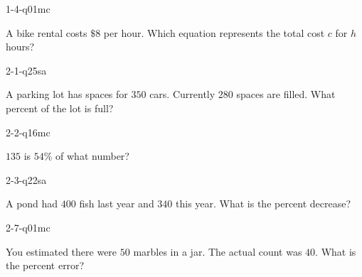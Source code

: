 
\begin{practiceQuestion}{1-4-q01}{mc}
\begin{questionText}
A bike rental costs $\$8$ per hour. Which equation represents the total cost $c$ for $h$ hours?
\end{questionText}
\end{practiceQuestion}

\begin{practiceQuestion}{2-1-q25}{sa}
\begin{questionText}
A parking lot has spaces for $350$ cars. Currently $280$ spaces are filled. What percent of the lot is full?
\end{questionText}
\end{practiceQuestion}

\begin{practiceQuestion}{2-2-q16}{mc}
\begin{questionText}
$135$ is $54\%$ of what number?
\end{questionText}
\end{practiceQuestion}

\begin{practiceQuestion}{2-3-q22}{sa}
\begin{questionText}
A pond had $400$ fish last year and $340$ this year. What is the percent decrease?


\end{questionText}
\end{practiceQuestion}

\begin{practiceQuestion}{2-7-q01}{mc}
\begin{questionText}
You estimated there were $50$ marbles in a jar. The actual count was $40$. What is the percent error?
\end{questionText}
\end{practiceQuestion}

